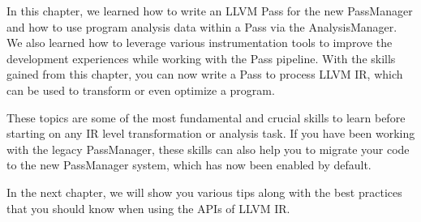 In this chapter, we learned how to write an LLVM Pass for the new PassManager and how to use program analysis data within a Pass via the AnalysisManager. We also learned how to leverage various instrumentation tools to improve the development experiences while working with the Pass pipeline. With the skills gained from this chapter, you can now write a Pass to process LLVM IR, which can be used to transform or even optimize a program.

These topics are some of the most fundamental and crucial skills to learn before starting on any IR level transformation or analysis task. If you have been working with the legacy PassManager, these skills can also help you to migrate your code to the new PassManager system, which has now been enabled by default. 

In the next chapter, we will show you various tips along with the best practices that you should know when using the APIs of LLVM IR.











